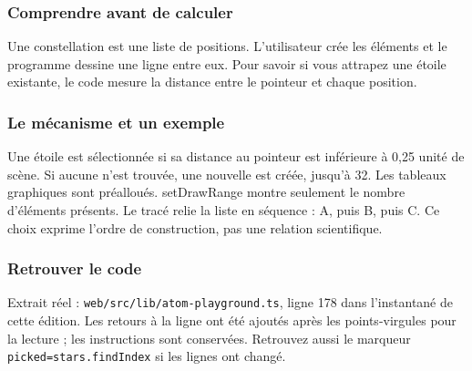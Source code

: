 \documentclass[
  canadien,
  11pt,
  letterpaper,
]{article}
\newenvironment{Shaded}{}{}
\newcommand{\AttributeTok}[1]{\textcolor[rgb]{0.49,0.56,0.16}{#1}}
\newcommand{\ControlFlowTok}[1]{\textcolor[rgb]{0.00,0.44,0.13}{\textbf{#1}}}
\newcommand{\DecValTok}[1]{\textcolor[rgb]{0.25,0.63,0.44}{#1}}
\newcommand{\FunctionTok}[1]{\textcolor[rgb]{0.02,0.16,0.49}{#1}}
\newcommand{\KeywordTok}[1]{\textcolor[rgb]{0.00,0.44,0.13}{\textbf{#1}}}
\newcommand{\NormalTok}[1]{#1}
\newcommand{\OperatorTok}[1]{\textcolor[rgb]{0.40,0.40,0.40}{#1}}
\newcommand{\SpecialCharTok}[1]{\textcolor[rgb]{0.25,0.44,0.63}{#1}}
\newcommand{\StringTok}[1]{\textcolor[rgb]{0.25,0.44,0.63}{#1}}
\newcommand{\VerbatimStringTok}[1]{\textcolor[rgb]{0.25,0.44,0.63}{#1}}
\begin{document}
\subsubsection{Comprendre avant de
calculer}\label{comprendre-avant-de-calculer-6}

Une constellation est une liste de positions. L'utilisateur crée les
éléments et le programme dessine une ligne entre eux. Pour savoir si
vous attrapez une étoile existante, le code mesure la distance entre le
pointeur et chaque position.

\subsubsection{Le mécanisme et un
exemple}\label{le-muxe9canisme-et-un-exemple-6}

Une étoile est sélectionnée si sa distance au pointeur est inférieure à
0,25 unité de scène. Si aucune n'est trouvée, une nouvelle est créée,
jusqu'à 32. Les tableaux graphiques sont préalloués. setDrawRange montre
seulement le nombre d'éléments présents. Le tracé relie la liste en
séquence : A, puis B, puis C. Ce choix exprime l'ordre de construction,
pas une relation scientifique.

\subsubsection{Retrouver le code}\label{retrouver-le-code-6}

Extrait réel : \texttt{web/src/lib/atom-playground.ts}, ligne 178 dans
l'instantané de cette édition. Les retours à la ligne ont été ajoutés
après les points-virgules pour la lecture ; les instructions sont
conservées. Retrouvez aussi le marqueur \texttt{picked=stars.findIndex}
si les lignes ont changé.

\begin{Shaded}
\end{Shaded}
\end{document}
